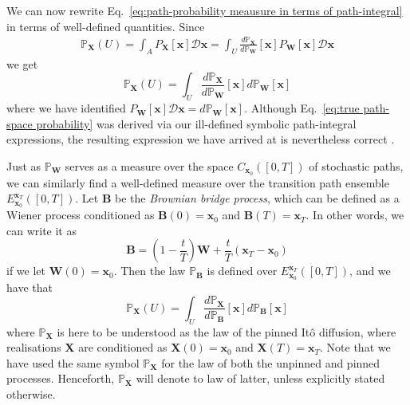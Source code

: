We can now rewrite Eq.~\ref{eq:path-probability meausure in terms of path-integral} in terms of well-defined quantities. Since
\begin{equation}
\begin{aligned}
\mathbb{P}_\mathbf{X}(U)  =  \int_A P_\mathbf{X}[\mathbf{x}] \mathcal{D} \mathbf{x} 
 = \int_U \frac{d \mathbb{P}_\mathbf{X}}{d \mathbb{P}_\mathbf{W}}[\mathbf{x}] P_\mathbf{W}[\mathbf{x}] \mathcal{D} \mathbf{x} 
\end{aligned}
\end{equation}
we get
\begin{equation} \label{eq:true path-space probability}
\mathbb{P}_\mathbf{X}(U) = \int_U \frac{d \mathbb{P}_\mathbf{X}}{d \mathbb{P}_\mathbf{W}}[\mathbf{x}] d \mathbb{P}_\mathbf{W}[\mathbf{x}]
\end{equation}
where we have identified $P_\mathbf{W}[\mathbf{x}] \mathcal{D} \mathbf{x} = d \mathbb{P}_\mathbf{W}[\mathbf{x}]$. Although Eq.~\ref{eq:true path-space probability} was derived via our ill-defined symbolic path-integral expressions, the resulting expression we have arrived at is nevertheless correct \citep{beskosMCMCMETHODSDIFFUSION2008, hairerAnalysisSPDEsArising2005, hairerAnalysisSPDEsArising2007}.

Just as $\mathbb{P}_\mathbf{W}$ serves as a measure over the space $C_{\mathbf{x}_0}([0,T])$ of stochastic paths, we can similarly find a well-defined measure over the transition path ensemble $E_{\mathbf{x}_0}^{\mathbf{x}_T}([0,T])$. Let $\mathbf{B}$ be the \textit{Brownian bridge process}, which can be defined as a Wiener process conditioned as $\mathbf{B}(0) = \mathbf{x}_0$ and $\mathbf{B}(T) = \mathbf{x}_T$. In other words, we can write it as
\begin{equation}
	\mathbf{B} = \left(1 - \frac{t}{T}\right) \mathbf{W} + \frac{t}{T} (\mathbf{x}_T - \mathbf{x}_0)
\end{equation}
if we let $\mathbf{W}(0) = \mathbf{x}_0$. Then the law $\mathbb{P}_\mathbf{B}$ is defined over $E_{\mathbf{x}_0}^{\mathbf{x}_T}([0,T])$, and we have that \citep{beskosMCMCMETHODSDIFFUSION2008}
\begin{equation} \label{eq:true path-space probability of TPE}
\mathbb{P}_\mathbf{X}(U) = \int_U \frac{d \mathbb{P}_\mathbf{X}}{d \mathbb{P}_\mathbf{B}}[\mathbf{x}] d \mathbb{P}_\mathbf{B}[\mathbf{x}]
\end{equation}
where $\mathbb{P}_\mathbf{X}$ is here to be understood as the law of the pinned It\^{o} diffusion, where realisations $\mathbf{X}$ are conditioned as $\mathbf{X}(0) = \mathbf{x}_0$ and $\mathbf{X}(T) = \mathbf{x}_T$. Note that we have used the same symbol $\mathbb{P}_\mathbf{X}$ for the law of both the unpinned and pinned processes. Henceforth, $\mathbb{P}_\mathbf{X}$ will denote to law of latter, unless explicitly stated otherwise.

